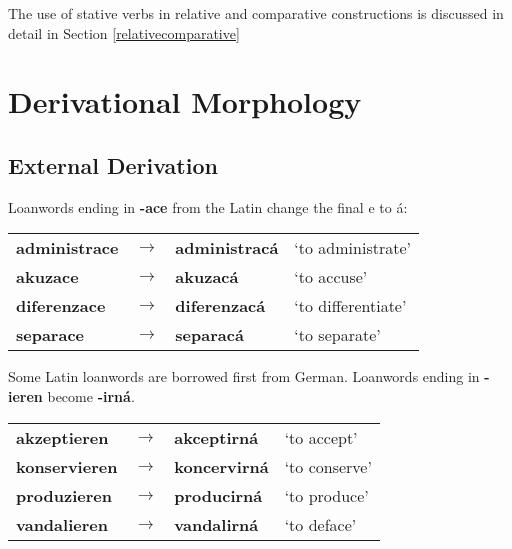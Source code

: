 The use of stative verbs in relative and comparative constructions is discussed in detail in Section \ref{relativecomparative}
\section{Derivational Morphology}
\subsection{External Derivation}
\par Loanwords ending in \textbf{-ace} from the Latin change the final e to á:
\begin{table}[h!]
	\centering \small
	\begin{tabu} to 0.9
		administrace 	& $\rightarrow$ & administracá 	& `to administrate' \\
		akuzace			& $\rightarrow$ & akuzacá		& `to accuse'\\
		diferenzace		& $\rightarrow$ & diferenzacá	& `to differentiate'\\
		separace		& $\rightarrow$ & separacá		& `to separate'\\
	\end{tabu}
\end{table}
\par Some Latin loanwords are borrowed first from German. Loanwords ending in \textbf{-ieren} become \textbf{-irná}.
\begin{table}[h!]
	\centering \small
	\begin{tabu} to 0.9
		akzeptieren 	& $\rightarrow$ & akceptirná 	& `to accept' \\
		konservieren	& $\rightarrow$ & koncervirná	& `to conserve'\\
		produzieren		& $\rightarrow$ & producirná	& `to produce'\\
		vandalieren		& $\rightarrow$ & vandalirná 	& `to deface'\\
	\end{tabu}
\end{table}
